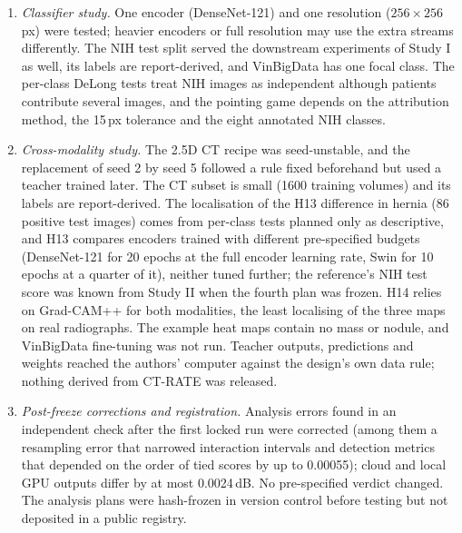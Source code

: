 \begin{enumerate}
 is no lateral imaging and no reader study. On JSRT the bone overlap of each audit site came from the reference model's bone map. Downstream
 models were not tuned per input, and the overlap analysis is not estimable on TBX11K. The models are for research use only.
\item \emph{Classifier study.} One encoder (DenseNet-121) and one resolution ($256\times256$\,px) were tested; heavier encoders or full
 resolution may use the extra streams differently. The NIH test split served the downstream experiments of Study I as well, its labels are
 report-derived, and VinBigData has one focal class. The per-class DeLong tests treat NIH images as independent although patients contribute
 several images, and the pointing game depends on the attribution method, the 15\,px tolerance and the eight annotated NIH classes.
\item \emph{Cross-modality study.} The 2.5D CT recipe was seed-unstable, and the replacement of seed 2 by seed 5 followed a rule fixed
 beforehand but used a teacher trained later. The CT subset is small (\num{1600} training volumes) and its labels are report-derived. The
 localisation of the H13 difference in hernia (86 positive test images) comes from per-class tests planned only as descriptive, and H13
 compares encoders trained with different pre-specified budgets (DenseNet-121 for 20 epochs at the full encoder learning rate, Swin for 10
 epochs at a quarter of it), neither tuned further; the reference's NIH test score was known from Study II when the fourth plan was frozen.
 H14 relies on
 Grad-CAM++ for both modalities, the least localising of the three maps on real radiographs. The example heat maps contain no mass or nodule,
 and VinBigData fine-tuning was not run. Teacher outputs, predictions and weights reached the authors' computer against the design's own
 data rule; nothing derived from CT-RATE was released.
\item \emph{Post-freeze corrections and registration.} Analysis errors found in an independent check after the first locked run were
 corrected (among them a resampling error that narrowed interaction intervals and detection metrics that depended on the order of tied
 scores by up to 0.00055); cloud and local GPU outputs differ by at most 0.0024\,dB. No pre-specified verdict changed. The analysis plans were
 hash-frozen in version control before testing but not deposited in a public registry.
\end{enumerate}
